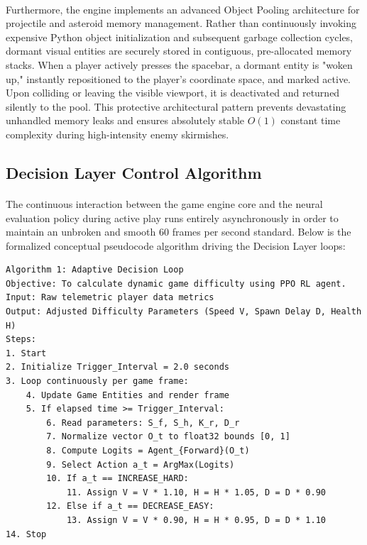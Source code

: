 \paragraph{} Furthermore, the engine implements an advanced Object Pooling architecture for projectile and asteroid memory management. Rather than continuously invoking expensive Python object initialization and subsequent garbage collection cycles, dormant visual entities are securely stored in contiguous, pre-allocated memory stacks. When a player actively presses the spacebar, a dormant entity is "woken up," instantly repositioned to the player's coordinate space, and marked active. Upon colliding or leaving the visible viewport, it is deactivated and returned silently to the pool. This protective architectural pattern prevents devastating unhandled memory leaks and ensures absolutely stable $O(1)$ constant time complexity during high-intensity enemy skirmishes.

\subsection{Decision Layer Control Algorithm}
\paragraph{} The continuous interaction between the game engine core and the neural evaluation policy during active play runs entirely asynchronously in order to maintain an unbroken and smooth 60 frames per second standard. Below is the formalized conceptual pseudocode algorithm driving the Decision Layer loops:

\begin{verbatim}
Algorithm 1: Adaptive Decision Loop
Objective: To calculate dynamic game difficulty using PPO RL agent.
Input: Raw telemetric player data metrics
Output: Adjusted Difficulty Parameters (Speed V, Spawn Delay D, Health H)
Steps:
1. Start
2. Initialize Trigger_Interval = 2.0 seconds
3. Loop continuously per game frame:
    4. Update Game Entities and render frame
    5. If elapsed time >= Trigger_Interval:
        6. Read parameters: S_f, S_h, K_r, D_r
        7. Normalize vector O_t to float32 bounds [0, 1]
        8. Compute Logits = Agent_{Forward}(O_t)
        9. Select Action a_t = ArgMax(Logits)
        10. If a_t == INCREASE_HARD:
            11. Assign V = V * 1.10, H = H * 1.05, D = D * 0.90
        12. Else if a_t == DECREASE_EASY:
            13. Assign V = V * 0.90, H = H * 0.95, D = D * 1.10
14. Stop
\end{verbatim}
